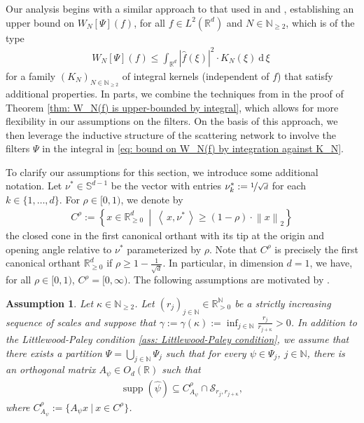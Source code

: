 \documentclass[11pt]{amsart}
\newcommand{\R}{{\mathbb{R}}}
\newcommand{\N}{\mathbb{N}}
\newcommand{\s}{\mathcal{S}}
\newcommand{\dxi}{\:\mathrm{d}\,\xi\:}
\newcommand{\norm}[1]{\ensuremath{\left\lVert\text{}#1\text{}\right\rVert}}
\newcommand{\ip}[1]{\ensuremath{\left<\text{} \, #1 \, \text{}\right>}}
\DeclareMathOperator{\supp}{supp}
\newtheorem{assumption}[theorem]{Assumption}
\newenvironment{proof sketch} {\textit{Proof sketch.}}{}
\begin{document}
  Our analysis begins with a similar approach to that used in \cite[Theorem 3.1]{waldspurger2017exponential} and \cite[Theorem 1, Theorem 2]{wiatowski2017energy}, establishing an upper bound on $W_N[\Psi](f)$, for all $f \in L^2(\R^d)$ and $N \in \N_{\geq 2}$, which is of the type
  \begin{align}\label{eq: bound on W_N(f) by integration against K_N}
    W_N[\Psi](f) \leq \int_{\R^d} |\widehat{f}(\xi)|^2 \cdot K_N(\xi) \dxi
  \end{align}
  for a family $(K_N)_{N \in \N_{\geq 2}}$ of integral kernels (independent of $f$) that satisfy additional properties. In parts, we combine the techniques from \cite{waldspurger2017exponential,wiatowski2017energy} in the proof of Theorem \ref{thm: W_N(f) is upper-bounded by integral}, which allows for more flexibility in our assumptions on the filters. On the basis of this approach, we then leverage the inductive structure of the scattering network to involve the filters $\Psi$ in the integral in \eqref{eq: bound on W_N(f) by integration against K_N}.
  
  To clarify our assumptions for this section, we introduce some additional notation. Let $\nu^* \in \mathbb{S}^{d-1}$ be the vector with entries $\nu_k^*:=\nicefrac{1}{\sqrt{d}}$ for each $k \in \{1,\ldots,d\}$. For $\rho \in [0,1)$, we  denote by 
  \begin{align}\label{def: cone}
    C^{\rho}:=\left\{x \in \R_{\geq 0}^d ~\middle|~ \ip{x,\nu^*} \geq (1-\rho) \cdot \norm{x}_2 \right\}
  \end{align}
  the closed cone in the first canonical orthant with its tip at the origin and opening angle relative to $\nu^*$ parameterized by $\rho$. Note that $C^{\rho}$ is precisely the first canonical orthant $\R_{\geq 0}^d$ if $\rho \geq 1-\frac{1}{\sqrt{d}}$. In particular, in dimension $d=1$, we have, for all $\rho \in [0,1)$, $C^\rho=[0,\infty)$. The following assumptions are motivated by \cite[Assumption 1]{wiatowski2017energy}.
  
  \begin{assumption}\label{ass: high-pass nature and analyticity of filters}
  Let $\kappa \in \N_{\geq 2}$. Let $(r_j)_{j \in \N} \in \R_{>0}^{\N}$ be a strictly increasing sequence of scales and suppose that $\gamma:=\gamma(\kappa):=\inf_{j \in \N} \frac{r_{j}}{r_{j+\kappa}}>0$. In addition to the Littlewood-Paley condition \eqref{ass: Littlewood-Paley condition}, we assume that there exists a partition $\Psi = \bigcup_{j \in \N} \Psi_j$ such that for every $\psi \in \Psi_j$, $j \in \N$, there is an orthogonal matrix $A_{\psi} \in O_d(\R)$ such that
  \begin{align*}
  \supp(\widehat{\psi})\subseteq C_{A_{\psi}}^\rho \cap \s_{r_{j},r_{j+\kappa}},
  \end{align*}
  where $C_{A_{\psi}}^\rho:=\{A_{\psi} x ~|~ x \in C^\rho\}$.
  \end{assumption}
  
\end{document}
